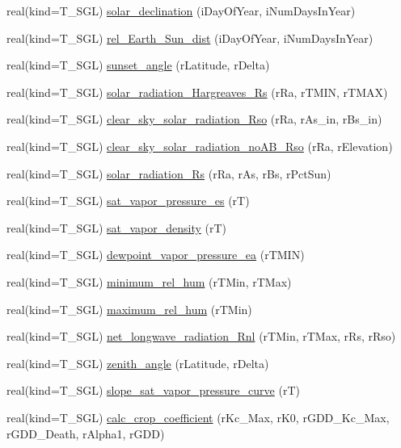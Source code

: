 \begin{DoxyCompactItemize}
\item 
real(kind=T\_\-SGL) \hyperlink{namespacemeteorological__functions_a45a598db078dc2575ce2c0ddcc2f69f0}{solar\_\-declination} (iDayOfYear, iNumDaysInYear)
\item 
real(kind=T\_\-SGL) \hyperlink{namespacemeteorological__functions_ade7f60bc93f4411aa8c4a157341f8b4b}{rel\_\-Earth\_\-Sun\_\-dist} (iDayOfYear, iNumDaysInYear)
\item 
real(kind=T\_\-SGL) \hyperlink{namespacemeteorological__functions_abdb8538c50386c8a369970151f80f73d}{sunset\_\-angle} (rLatitude, rDelta)
\item 
real(kind=T\_\-SGL) \hyperlink{namespacemeteorological__functions_ac17c220d158f0bde31c9f9ef399091a1}{solar\_\-radiation\_\-Hargreaves\_\-Rs} (rRa, rTMIN, rTMAX)
\item 
real(kind=T\_\-SGL) \hyperlink{namespacemeteorological__functions_a48647f465f1e4cbd25c66406f4b22c56}{clear\_\-sky\_\-solar\_\-radiation\_\-Rso} (rRa, rAs\_\-in, rBs\_\-in)
\item 
real(kind=T\_\-SGL) \hyperlink{namespacemeteorological__functions_a333c8237b31d94b94b0e85b8bd434db6}{clear\_\-sky\_\-solar\_\-radiation\_\-noAB\_\-Rso} (rRa, rElevation)
\item 
real(kind=T\_\-SGL) \hyperlink{namespacemeteorological__functions_a3f4af0d18369a72079c3cfc0af56eb74}{solar\_\-radiation\_\-Rs} (rRa, rAs, rBs, rPctSun)
\item 
real(kind=T\_\-SGL) \hyperlink{namespacemeteorological__functions_a661699aa6c8c654d6aa0ddd8175be9ef}{sat\_\-vapor\_\-pressure\_\-es} (rT)
\item 
real(kind=T\_\-SGL) \hyperlink{namespacemeteorological__functions_a67a6a39a9e60d4711972647406a1e6fa}{sat\_\-vapor\_\-density} (rT)
\item 
real(kind=T\_\-SGL) \hyperlink{namespacemeteorological__functions_abdb2c6342c1ec952d3697d89a79376b1}{dewpoint\_\-vapor\_\-pressure\_\-ea} (rTMIN)
\item 
real(kind=T\_\-SGL) \hyperlink{namespacemeteorological__functions_a573561cffc2aaee2f4570c4d6db0e93b}{minimum\_\-rel\_\-hum} (rTMin, rTMax)
\item 
real(kind=T\_\-SGL) \hyperlink{namespacemeteorological__functions_adfe00f4b647649a9b3134e54311d6835}{maximum\_\-rel\_\-hum} (rTMin)
\item 
real(kind=T\_\-SGL) \hyperlink{namespacemeteorological__functions_a7144b3142f66dfaf06985f0f908400b4}{net\_\-longwave\_\-radiation\_\-Rnl} (rTMin, rTMax, rRs, rRso)
\item 
real(kind=T\_\-SGL) \hyperlink{namespacemeteorological__functions_ac9ecb6e3268d4b67678af28b23cce215}{zenith\_\-angle} (rLatitude, rDelta)
\item 
real(kind=T\_\-SGL) \hyperlink{namespacemeteorological__functions_a6236f001864bef39fdd6a688e9c0f430}{slope\_\-sat\_\-vapor\_\-pressure\_\-curve} (rT)
\item 
real(kind=T\_\-SGL) \hyperlink{namespacemeteorological__functions_ad8a6559646c993f06e81444054cc0076}{calc\_\-crop\_\-coefficient} (rKc\_\-Max, rK0, rGDD\_\-Kc\_\-Max, rGDD\_\-Death, rAlpha1, rGDD)
\end{DoxyCompactItemize}



